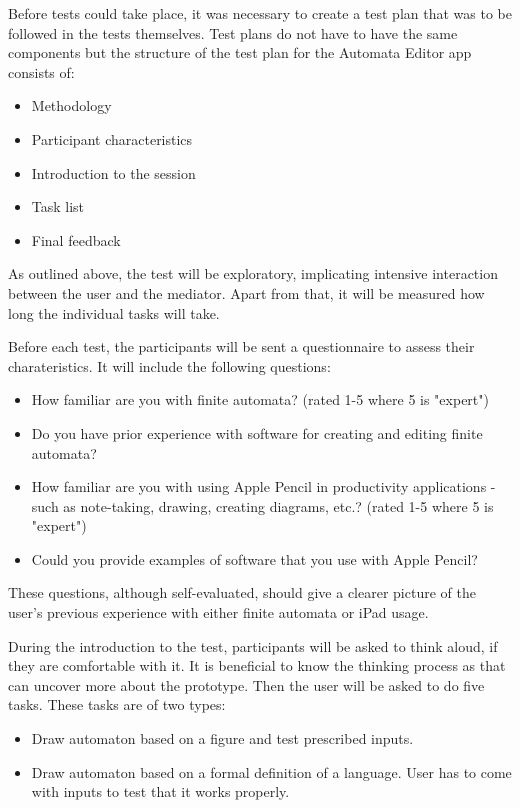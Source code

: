 Before tests could take place, it was necessary to create a test plan that was to be followed in the tests themselves. Test plans do not have to have the same components but the structure of the test plan for the Automata Editor app consists of:
\begin{itemize}
    \item Methodology
    \item Participant characteristics
    \item Introduction to the session
    \item Task list
    \item Final feedback
\end{itemize}

As outlined above, the test will be exploratory, implicating intensive interaction between the user and the mediator. Apart from that, it will be measured how long the individual tasks will take.

Before each test, the participants will be sent a questionnaire to assess their charateristics. It will include the following questions:
\begin{itemize}
    \item How familiar are you with finite automata? (rated 1-5 where 5 is "expert")
    \item Do you have prior experience with software for creating and editing finite automata?
    \item How familiar are you with using Apple Pencil in productivity applications - such as note-taking, drawing, creating diagrams, etc.? (rated 1-5 where 5 is "expert")
    \item Could you provide examples of software that you use with Apple Pencil?
\end{itemize}
These questions, although self-evaluated, should give a clearer picture of the user's previous experience with either finite automata or iPad usage.

During the introduction to the test, participants will be asked to think aloud, if they are comfortable with it. It is beneficial to know the thinking process as that can uncover more about the prototype. Then the user will be asked to do five tasks. These tasks are of two types:
\begin{itemize}
    \item Draw automaton based on a figure and test prescribed inputs.
    \item Draw automaton based on a formal definition of a language. User has to come with inputs to test that it works properly.
\end{itemize}

